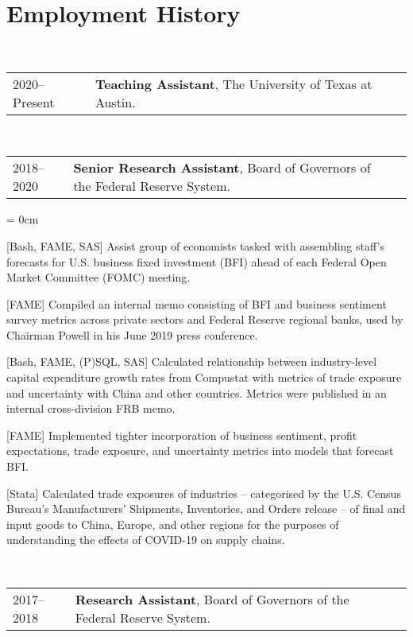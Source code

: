 \documentclass[a4paper, 11pt]{article}
\begin{document}
  \section{Employment History}
     ~\begin{tabular}{llP{15cm}}
      2020--Present & \textbf{Teaching Assistant}, The University of Texas at Austin.
    \end{tabular}
  
      \vspace*{1em}
  
    ~\begin{tabular}{llP{15cm}}
      2018--2020 & \textbf{Senior Research Assistant}, Board of Governors of the Federal Reserve System.
    \end{tabular}

    \begin{compactitem}\parskip = 0cm
      \item {[Bash, FAME, SAS]} Assist group of economists tasked with assembling staff's forecasts for U.S. business fixed investment (BFI) ahead of each Federal Open Market Committee (FOMC) meeting.
      \item {[FAME]} Compiled an internal memo consisting of BFI and business sentiment survey metrics across private sectors and Federal Reserve regional banks, used by Chairman Powell in his June 2019 press conference.
      \item {[Bash, FAME, (P)SQL, SAS]} Calculated relationship between industry-level capital expenditure growth rates from Compustat with metrics of trade exposure and uncertainty with China and other countries. Metrics were published in an internal cross-division FRB memo.
      \item {[FAME]} Implemented tighter incorporation of business sentiment, profit expectations, trade exposure, and uncertainty metrics into models that forecast BFI.
      \item {[Stata]} Calculated trade exposures of industries -- categorised by the U.S. Census Bureau's Manufacturers' Shipments, Inventories, and Orders release -- of final and input goods to China, Europe, and other regions for the purposes of understanding the effects of COVID-19 on supply chains.
    \end{compactitem}

    \vspace*{1em}

    ~\begin{tabular}{llP{15cm}}
      2017--2018 & \textbf{Research Assistant}, Board of Governors of the Federal Reserve System.
    \end{tabular}
\end{document}
